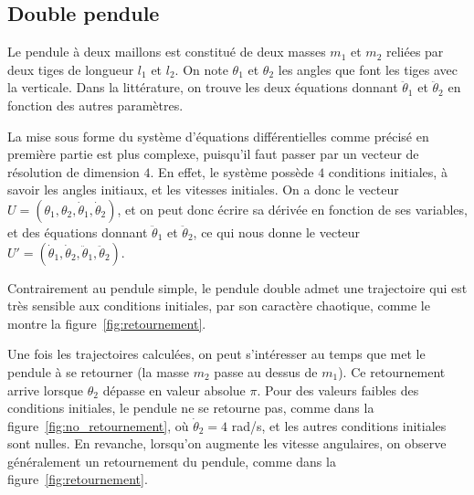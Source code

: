 \subsection{Double pendule}

Le pendule à deux maillons est constitué de deux masses $ m_1 $ et $ m_2 $ 
reliées par deux tiges de longueur $ l_1 $ et $ l _2 $. On note $ \theta_1 $ et $ \theta_2 $ les angles
que font les tiges avec la verticale. Dans la littérature, on trouve les deux équations donnant $\ddot \theta_1$ et $\ddot \theta_2$ en fonction des autres paramètres.

La mise sous forme du système d'équations différentielles comme précisé en première partie est plus complexe,
puisqu'il faut passer par un vecteur de résolution de dimension $4$.
En effet, le système possède $4$ conditions initiales, à savoir les angles initiaux, et les vitesses initiales.
On a donc le vecteur $ U = (\theta_1, \theta_2, \dot \theta_1, \dot \theta_2) $, et on peut donc écrire sa dérivée en fonction de ses variables, et des équations donnant $\ddot \theta_1$ et $\ddot \theta_2$,
ce qui nous donne le vecteur $ U' = (\dot \theta_1, \dot \theta_2, \ddot \theta_1, \ddot \theta_2) $.

Contrairement au pendule simple, le pendule double admet une trajectoire qui est très sensible aux conditions initiales, par son caractère chaotique, comme le montre la figure~\ref{fig:retournement}.

Une fois les trajectoires calculées, on peut s'intéresser au temps que met le pendule à se retourner (la masse $ m_2 $ passe au
dessus de $ m_1 $).
Ce retournement arrive lorsque $ \theta_2 $ dépasse en valeur absolue $ \pi $.
Pour des valeurs faibles des conditions initiales, le pendule ne se retourne pas, comme dans la figure~\ref{fig:no_retournement},
où $ \dot \theta_2 = 4 $ rad/s, et les autres conditions initiales sont nulles.
En revanche, lorsqu'on augmente les vitesse angulaires, on observe généralement un retournement du pendule, comme dans la figure~\ref{fig:retournement}.

